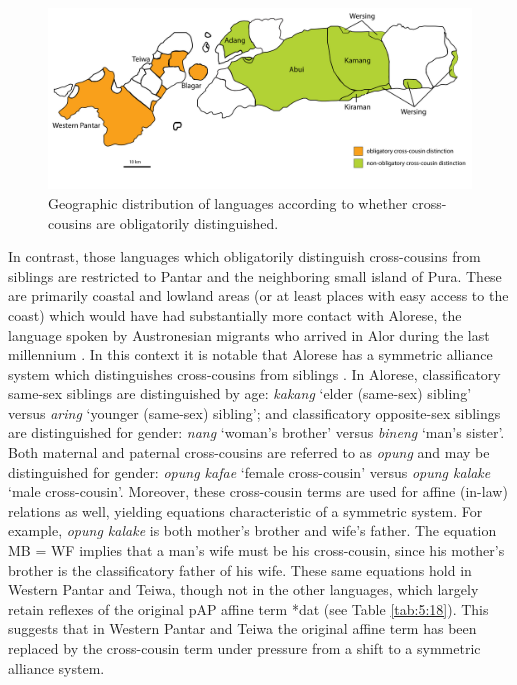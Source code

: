 \begin{figure}
\includegraphics[width=\textwidth]{figures/Holton_ch5_fig15.pdf}
\caption{Geographic distribution of languages according to whether  cross-cousins are obligatorily distinguished.}
\label{fig_cross-cousin_map}
\end{figure}  
 

In contrast, those languages which obligatorily distinguish cross-cousins from siblings are restricted to Pantar and the neighboring small island of Pura. These are primarily coastal and lowland areas (or at least places with easy access to the coast) which would have had substantially more contact with Alorese, the language spoken by Austronesian migrants who arrived in Alor during the last millennium \citep{Klamer2011}. In this context it is notable that Alorese has a symmetric alliance system which distinguishes cross-cousins from siblings \citep{Needham1956,Barnes1973}. In Alorese, classificatory same-sex siblings are distinguished by age: \textit{kakang} `elder (same-sex) sibling' versus \textit{aring} `younger (same-sex) sibling'; and classificatory opposite-sex siblings are distinguished for gender: \textit{nang} `woman's brother' versus \textit{bineng} `man's sister'. Both maternal and paternal cross-cousins are referred to as \textit{opung} and may be distinguished for gender: \textit{opung kafae} `female cross-cousin' versus \textit{opung kalake} `male cross-cousin'. Moreover, these cross-cousin terms are used for affine (in-law) relations as well, yielding equations characteristic of a symmetric system. For example, \textit{opung kalake} is both mother's brother and wife's father. The equation MB = WF implies that a man's wife must be his cross-cousin, since his mother's brother is the classificatory father of his wife. These same equations hold in Western Pantar and Teiwa, though not in the other languages, which largely retain reflexes of the original pAP affine term *dat (see Table \ref{tab:5:18}). This suggests that in Western Pantar and Teiwa the original affine term has been replaced by the cross-cousin term under pressure from a shift to a symmetric alliance system. 

